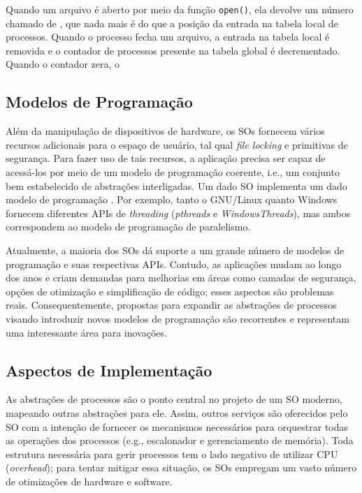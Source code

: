 Quando um arquivo é aberto por meio da função \texttt{open()}, ela devolve um
número chamado de ,
que nada mais é do que a posição da entrada na tabela local de processos.
Quando o processo fecha um arquivo, a entrada na tabela local é removida e o
contador de processos presente na tabela global é decrementado. Quando o
contador zera, o 

\subsection{Modelos de Programação}

Além da manipulação de dispositivos de hardware, os SOs fornecem vários
recursos adicionais para o espaço de usuário, tal qual \emph{file locking} e
primitivas de segurança. Para fazer uso de tais recursos, a aplicação precisa
ser capaz de acessá-los por meio de um modelo de programação coerente, i.e., um
conjunto bem estabelecido de abstrações interligadas. Um dado SO implementa um
dado modelo de programação . Por exemplo, tanto o
GNU/Linux quanto Windows fornecem diferentes APIs de \emph{threading}
(\emph{pthreads} e \emph{WindowsThreads}), mas ambos correspondem ao modelo de
programação de paralelismo.

Atualmente, a maioria dos SOs dá suporte a um grande número de modelos de
programação e suas respectivas APIs. Contudo, as aplicações mudam ao longo dos
anos e criam demandas para melhorias em áreas como camadas de segurança, opções
de otimização e simplificação de código; esses aspectos são problemas reais.
Consequentemente, propostas para expandir as abstrações de processos visando
introduzir novos modelos de programação são recorrentes e representam uma
interessante área para inovações.

\subsection{Aspectos de Implementação}

As abstrações de processos são o ponto central no projeto de um SO moderno,
mapeando outras abstrações para ele. Assim, outros serviços são oferecidos pelo
SO com a intenção de fornecer os mecanismos necessários para orquestrar todas
as operações dos processos (e.g., escalonador e gerenciamento de memória). Toda
estrutura necessária para gerir processos tem o lado negativo de utilizar CPU
(\emph{overhead}); para tentar mitigar essa situação, os SOs empregam um vasto
número de otimizações de hardware e software.

